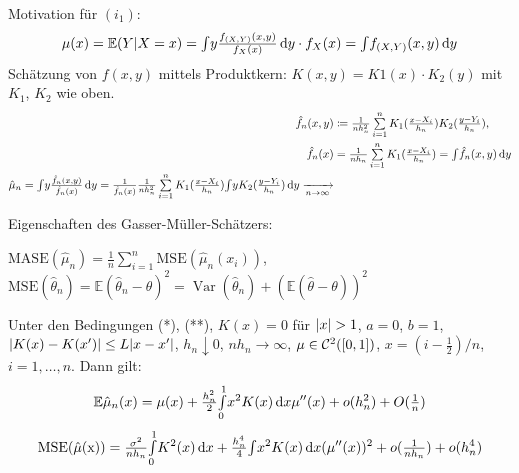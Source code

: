 \documentclass{cheat-sheet}
\newcommand{\E}{\mathbb{E}} %
\newcommand{\Cont}{\mathcal{C}} %
\DeclareMathOperator{\var}{Var} %
\begin{document}
Motivation für $(i_1)$:
\[
  \mu(x) = \E(Y|X=x) = \IInt{y \tfrac{f_{(X,Y)}(x,y)}{f_X(x)}}{y} \cdot f_X(x) = \IInt{f_{(X,Y)} (x,y)}{y}
\]
Schätzung von $f(x,y)$ mittels Produktkern: $K(x, y) = K1(x) \cdot K_2(y)$ mit $K_1$, $K_2$ wie oben. %
\begin{align*}
  \hat{f}_n(x, y) & \coloneqq \tfrac{1}{n h_n^2} \sum_{i=1}^n K_1(\tfrac{x-X_i}{h_n}) K_2(\tfrac{y-Y_i}{h_n}), \\
  \hat{f}_n(x) & = \tfrac{1}{n h_n} \sum_{i=1}^n K_1(\tfrac{x - X_i}{h_n}) = \IInt{\hat{f}_n(x,y)}{y} \\
  \hat{\mu}_n = \IInt{y \tfrac{\hat{f}_n(x,y)}{\hat{f}_n(x)}}{y} = \tfrac{1}{\hat{f}_n(x)} \tfrac{1}{n h_n^2} \sum_{i=1}^n K_1(\tfrac{x - X_i}{h_n}) \IInt{y K_2(\tfrac{y - Y_i}{h_n})}{y} \xra[n \to \infty]{} 
\end{align*}

Eigenschaften des Gasser-Müller-Schätzers:

$\mathrm{MASE}(\hat{\mu}_n) = \tfrac{1}{n} \sum_{i=1}^n \mathrm{MSE}(\hat{\mu}_n (x_i))$, $\mathrm{MSE}(\hat{\theta}_n) = \E (\hat{\theta}_n - \theta)^2 = \var(\hat{\theta}_n) + (\E (\hat{\theta} - \theta))^2$

\begin{satz}
  Unter den Bedingungen (*), (**), $K(x) = 0$ für $\lvert x\rvert > 1$, $a=0$, $b=1$, $\lvert K(x) - K(x')\rvert \leq L \lvert x - x'\rvert$, $h_n \downarrow 0$, $n h_n \to \infty$, $\mu \in \Cont^2(\cinterval{0}{1})$, $x = (i - \tfrac{1}{2}) / n$, $i = 1, \ldots, n$.
  Dann gilt:
  \[
    \E \hat{\mu}_n(x) = \mu(x) + \tfrac{h_n^2}{2} \Int{0}{1}{x^2 K(x)}{x} \mu''(x) + o(h_n^2) + O(\tfrac{1}{n})
  \]
  \[
    \mathrm{MSE(\hat{\mu}(x))} = \tfrac{\sigma^2}{n h_n} {\textstyle \int\limits_{0}^{1}} K^2 (x) \,\mathrm{d} x + \tfrac{h_n^4}{4} {\textstyle \int} x^2 K(x) \,\mathrm{d} x (\mu''(x))^2 + o(\tfrac{1}{n h_n}) + o(h_n^4)
  \]
\end{satz}
\end{document}
